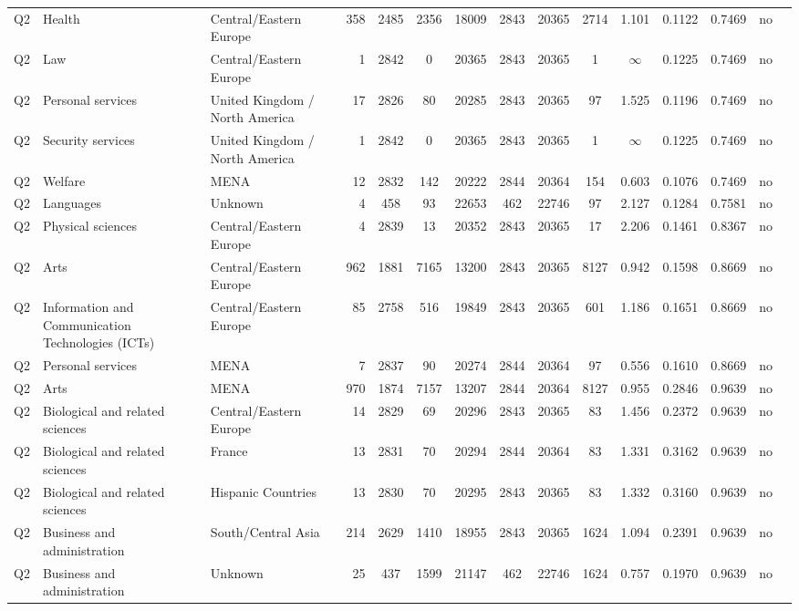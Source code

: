 \begin{longtable}{lllrcccccccccll}
Q2 & Health & Central/Eastern Europe & 358 & 2485 & 2356 & 18009 & 2843 & 20365 & 2714 & 1.101 & 0.1122 & 0.7469 & no \\
Q2 & Law & Central/Eastern Europe & 1 & 2842 & 0 & 20365 & 2843 & 20365 & 1 & $\infty$ & 0.1225 & 0.7469 & no \\
Q2 & Personal services & United Kingdom / North America & 17 & 2826 & 80 & 20285 & 2843 & 20365 & 97 & 1.525 & 0.1196 & 0.7469 & no \\
Q2 & Security services & United Kingdom / North America & 1 & 2842 & 0 & 20365 & 2843 & 20365 & 1 & $\infty$ & 0.1225 & 0.7469 & no \\
Q2 & Welfare & MENA & 12 & 2832 & 142 & 20222 & 2844 & 20364 & 154 & 0.603 & 0.1076 & 0.7469 & no \\
Q2 & Languages & Unknown & 4 & 458 & 93 & 22653 & 462 & 22746 & 97 & 2.127 & 0.1284 & 0.7581 & no \\
Q2 & Physical sciences & Central/Eastern Europe & 4 & 2839 & 13 & 20352 & 2843 & 20365 & 17 & 2.206 & 0.1461 & 0.8367 & no \\
Q2 & Arts & Central/Eastern Europe & 962 & 1881 & 7165 & 13200 & 2843 & 20365 & 8127 & 0.942 & 0.1598 & 0.8669 & no \\
Q2 & Information and Communication Technologies (ICTs) & Central/Eastern Europe & 85 & 2758 & 516 & 19849 & 2843 & 20365 & 601 & 1.186 & 0.1651 & 0.8669 & no \\
Q2 & Personal services & MENA & 7 & 2837 & 90 & 20274 & 2844 & 20364 & 97 & 0.556 & 0.1610 & 0.8669 & no \\
Q2 & Arts & MENA & 970 & 1874 & 7157 & 13207 & 2844 & 20364 & 8127 & 0.955 & 0.2846 & 0.9639 & no \\
Q2 & Biological and related sciences & Central/Eastern Europe & 14 & 2829 & 69 & 20296 & 2843 & 20365 & 83 & 1.456 & 0.2372 & 0.9639 & no \\
Q2 & Biological and related sciences & France & 13 & 2831 & 70 & 20294 & 2844 & 20364 & 83 & 1.331 & 0.3162 & 0.9639 & no \\
Q2 & Biological and related sciences & Hispanic Countries & 13 & 2830 & 70 & 20295 & 2843 & 20365 & 83 & 1.332 & 0.3160 & 0.9639 & no \\
Q2 & Business and administration & South/Central Asia & 214 & 2629 & 1410 & 18955 & 2843 & 20365 & 1624 & 1.094 & 0.2391 & 0.9639 & no \\
Q2 & Business and administration & Unknown & 25 & 437 & 1599 & 21147 & 462 & 22746 & 1624 & 0.757 & 0.1970 & 0.9639 & no \\

\end{longtable}
